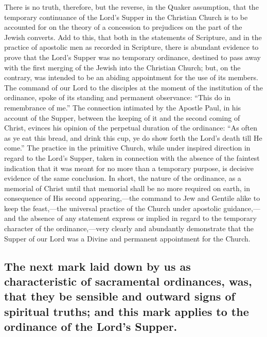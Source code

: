 \documentclass[]{book}
\begin{document}
There is no truth, therefore, but the reverse, in the Quaker assumption, that the temporary continuance of the Lord's Supper in the Christian Church is to be accounted for on the theory of a concession to prejudices on the part of the Jewish converts. Add to this, that both in the statements of Scripture, and in the practice of apostolic men as recorded in Scripture, there is abundant evidence to prove that the Lord's Supper was no temporary ordinance, destined to pass away with the first merging of the Jewish into the Christian Church; but, on the contrary, was intended to be an abiding appointment for the use of its members. The command of our Lord to the disciples at the moment of the institution of the ordinance, spoke of its standing and permanent observance: ``This do in remembrance of me.'' The connection intimated by the Apostle Paul, in his account of the Supper, between the keeping of it and the second coming of Christ, evinces his opinion of the perpetual duration of the ordinance: ``As often as ye eat this bread, and drink this cup, ye do show forth the Lord's death till He come.'' The practice in the primitive Church, while under inspired direction in regard to the Lord's Supper, taken in connection with the absence of the faintest indication that it was meant for no more than a temporary purpose, is decisive evidence of the same conclusion. In short, the nature of the ordinance, as a memorial of Christ until that memorial shall be no more required on earth, in consequence of His second appearing,---the command to Jew and Gentile alike to keep the feast,---the universal practice of the Church under apostolic guidance,---and the absence of any statement express or implied in regard to the temporary character of the ordinance,---very clearly and abundantly demonstrate that the Supper of our Lord was a Divine and permanent appointment for the Church.

\hypertarget{the-next-mark-laid-down-by-us-as-characteristic-of-sacramental-ordinances-was-that-they-be-sensible-and-outward-signs-of-spiritual-truths-and-this-mark-applies-to-the-ordinance-of-the-lords-supper.}{%
\subsection{The next mark laid down by us as characteristic of sacramental ordinances, was, that they be sensible and outward signs of spiritual truths; and this mark applies to the ordinance of the Lord's Supper.}\label{the-next-mark-laid-down-by-us-as-characteristic-of-sacramental-ordinances-was-that-they-be-sensible-and-outward-signs-of-spiritual-truths-and-this-mark-applies-to-the-ordinance-of-the-lords-supper.}}
\end{document}
